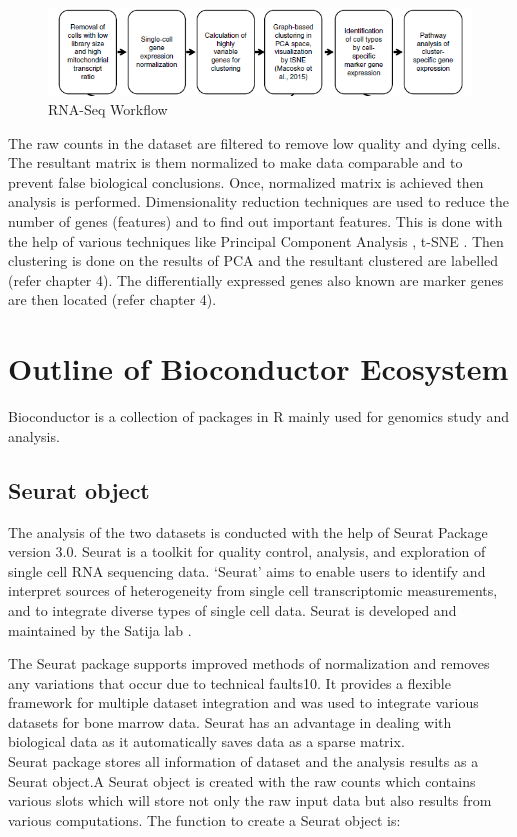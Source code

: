 \documentclass{sydneythesis}
\begin{document}
\begin{figure}[H]
  \includegraphics[scale=0.8]{rna-work.png}
  \caption{RNA-Seq Workflow}
  \label{fig:rs}
\end{figure}

The raw counts in the dataset are filtered to remove low quality and
dying cells. The resultant matrix is them normalized to make data
comparable and to prevent false biological
conclusions\autocite{steinhoff2006normalization}. Once, normalized
matrix is achieved then analysis is performed. Dimensionality reduction
techniques are used to reduce the number of genes (features) and to find
out important features. This is done with the help of various techniques
like Principal Component Analysis \autocite{jolliffe2011principal},
t-SNE \autocite{maaten2008visualizing}. Then clustering is done on the
results of PCA and the resultant clustered are labelled (refer chapter
4). The differentially expressed genes also known are marker genes are
then located (refer chapter 4).

\chapter{Outline of Bioconductor
Ecosystem}\label{outline-of-bioconductor-ecosystem}

Bioconductor is a collection of packages in R mainly used for genomics
study and analysis.

\section{Seurat object}\label{sec:seurat}

The analysis of the two datasets is conducted with the help of Seurat
Package version 3.0. Seurat is a toolkit for quality control, analysis,
and exploration of single cell RNA sequencing data. `Seurat' aims to
enable users to identify and interpret sources of heterogeneity from
single cell transcriptomic measurements, and to integrate diverse types
of single cell data. Seurat is developed and maintained by the Satija
lab \autocite{seurat}.

The Seurat package supports improved methods of normalization and
removes any variations that occur due to technical faults10. It provides
a flexible framework for multiple dataset integration and was used to
integrate various datasets for bone marrow data. Seurat has an advantage
in dealing with biological data as it automatically saves data as a
sparse matrix.\\
Seurat package stores all information of dataset and the analysis
results as a Seurat object.A Seurat object is created with the raw
counts which contains various slots which will store not only the raw
input data but also results from various computations. The function to
create a Seurat object is:
\end{document}
